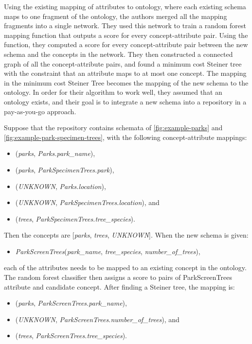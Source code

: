 Using the existing mapping of attributes to ontology, where each existing schema maps to one fragment of the ontology, the authors merged all the mapping fragments into a single network. They used this network to train a random forest mapping function that outputs a score for every concept-attribute pair. Using the function, they computed a score for every concept-attribute pair between the new schema and the concepts in the network. They then constructed a connected graph of all the concept-attribute pairs, and found a minimum cost Steiner tree with the constraint that an attribute maps to at most one concept. The mapping in the minimum cost Steiner Tree becomes the mapping of the new schema to the ontology. In order for their algorithm to work well, they assumed that an ontology exists, and their goal is to integrate a new schema into a repository in a pay-as-you-go approach.

Suppose that the repository contains schemata of \autoref{fig:example-parks} and \autoref{fig:example-park-specimen-trees}, with the following concept-attribute mappings:
\begin{itemize}
	\item[] (\textit{parks}, \textit{Parks.park\_name}),
	\item[] (\textit{parks}, \textit{ParkSpecimenTrees.park}),
	\item[] (\textit{UNKNOWN}, \textit{Parks.location}),
	\item[] (\textit{UNKNOWN}, \textit{ParkSpecimenTrees.location}), and
	\item[] (\textit{trees}, \textit{ParkSpecimenTrees.tree\_species}).
\end{itemize}

Then the concepts are [\textit{parks}, \textit{trees}, \textit{UNKNOWN}]. When the new schema is given:
\begin{itemize}
	\item[] \textit{ParkScreenTrees}(\textit{park\_name}, \textit{tree\_species}, \textit{number\_of\_trees}),
\end{itemize}
each of the attributes needs to be mapped to an existing concept in the ontology. The random forest classifier then assigns a score to pairs of ParkScreenTrees attribute and candidate concept. 
After finding a Steiner tree, the mapping is:
\begin{itemize}
	\item[] (\textit{parks}, \textit{ParkScreenTrees.park\_name}),
	\item[] (\textit{UNKNOWN}, \textit{ParkScreenTrees.number\_of\_trees}), and
	\item[] (\textit{trees}, \textit{ParkScreenTrees.tree\_species}).
\end{itemize}

